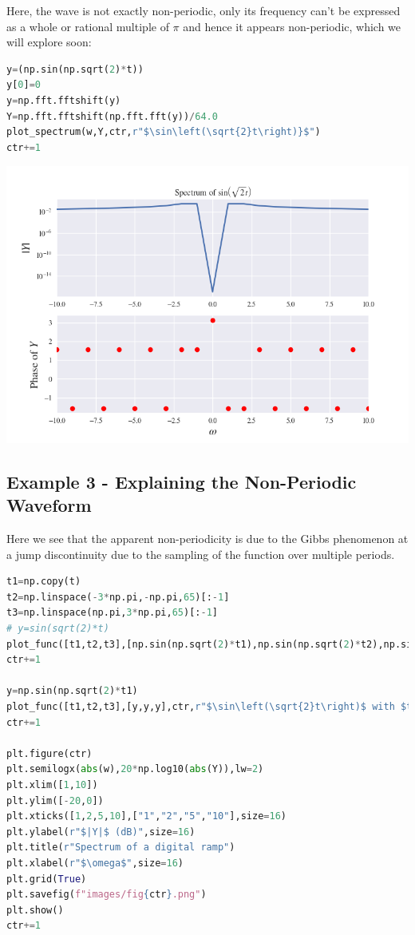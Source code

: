 \documentclass[12pt]{article}
\begin{document}
Here, the wave is not exactly non-periodic, only its frequency can't be expressed as a whole or rational multiple of $\pi$ and hence it appears non-periodic, which we will explore soon:

\begin{lstlisting}[language=python]
y=(np.sin(np.sqrt(2)*t))
y[0]=0
y=np.fft.fftshift(y)
Y=np.fft.fftshift(np.fft.fft(y))/64.0
plot_spectrum(w,Y,ctr,r"$\sin\left(\sqrt{2}t\right)}$")
ctr+=1
\end{lstlisting}

\begin{center}
    \includegraphics[scale=0.8]{images/fig2.png}
\end{center}
\pagebreak
\subsection{Example 3 - Explaining the Non-Periodic Waveform}
Here we see that the apparent non-periodicity is due to the Gibbs phenomenon at a jump discontinuity due to the sampling of the function over multiple periods.

\begin{lstlisting}[language=python]
t1=np.copy(t)
t2=np.linspace(-3*np.pi,-np.pi,65)[:-1]
t3=np.linspace(np.pi,3*np.pi,65)[:-1]
# y=sin(sqrt(2)*t)
plot_func([t1,t2,t3],[np.sin(np.sqrt(2)*t1),np.sin(np.sqrt(2)*t2),np.sin(np.sqrt(2)*t3)],ctr,r"$\sin\left(\sqrt{2}t\right)$")
ctr+=1

y=np.sin(np.sqrt(2)*t1)
plot_func([t1,t2,t3],[y,y,y],ctr,r"$\sin\left(\sqrt{2}t\right)$ with $t$ wrapping every $2\pi$",marker='o')
ctr+=1

plt.figure(ctr)
plt.semilogx(abs(w),20*np.log10(abs(Y)),lw=2)
plt.xlim([1,10])
plt.ylim([-20,0])
plt.xticks([1,2,5,10],["1","2","5","10"],size=16)
plt.ylabel(r"$|Y|$ (dB)",size=16)
plt.title(r"Spectrum of a digital ramp")
plt.xlabel(r"$\omega$",size=16)
plt.grid(True)
plt.savefig(f"images/fig{ctr}.png")
plt.show()
ctr+=1
\end{lstlisting}
\end{document}

